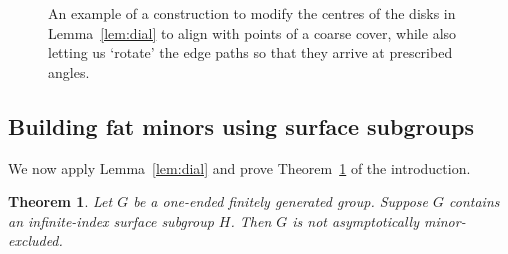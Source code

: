 \documentclass[10pt,a4paper]{amsart}
\newtheorem{theorem}{Theorem}[section]
\theoremstyle{definition}
\begin{document}
\begin{figure}[t]

\caption{An example of a construction to modify the centres of the disks in Lemma~\ref{lem:dial} to align with points of a coarse cover, while also letting us `rotate' the edge paths so that they arrive at prescribed angles. }\label{fig:circles}

\end{figure}
	


\subsection{Building fat minors using surface subgroups}

We now apply Lemma~\ref{lem:dial} and prove Theorem~\ref{thm:surface-subgroup} of the introduction. 


\begin{theorem}\label{thm:surface-subgroup}
	Let $G$ be a one-ended finitely generated group. Suppose $G$ contains an infinite-index surface subgroup $H$. Then $G$ is not asymptotically minor-excluded. 
\end{theorem}
\end{document}
